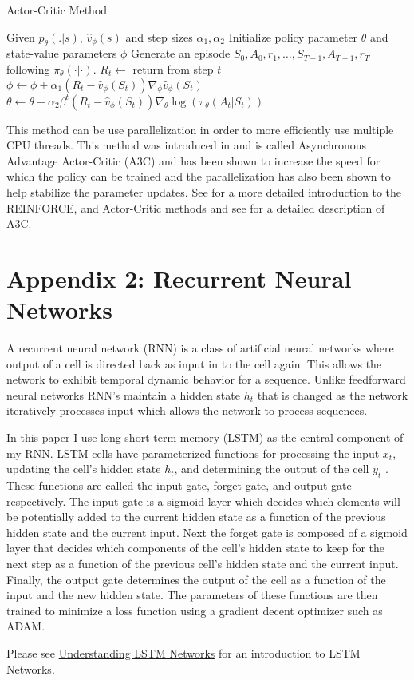 \documentclass[12pt]{article}
\begin{document}
\begin{algorithm}[H]
  \caption{Actor-Critic Method}
  \begin{algorithmic}[1]
    \Procedure{}{} Given $p_\theta(.|s)$, $\hat{v}_\phi(s)$ and step sizes $\alpha_1, \alpha_2$
    \State Initialize policy parameter $\theta$ and state-value parameters $\phi$
    \State Generate an episode $S_0, A_0, r_1,\dots,S_{T-1},A_{T-1},r_T$ following $\pi_\theta(\cdot|\cdot)$.
    \State $R_t \leftarrow $ return from step $t$
    \State $\phi \leftarrow \phi + \alpha_1 (R_t-\hat{v}_\phi(S_t) )\nabla_\phi\hat{v}_\phi(S_t)$
    \State $\theta \leftarrow \theta + \alpha_2 \beta^t (R_t-\hat{v}_\phi(S_t) )\nabla_\theta \log(\pi_\theta(A_t|S_t))$
    \EndFor
    \EndWhile
    \EndProcedure
  \end{algorithmic}
\end{algorithm}

This method can be use parallelization in order to more efficiently use multiple CPU threads. This method was introduced in
\citet{2016_Mnih} and is called Asynchronous Advantage Actor-Critic (A3C) and has been shown to increase the speed for which the policy can be trained and the parallelization has also been shown to help stabilize the parameter updates. See \citep{1998_Sutton} for a more detailed introduction to the REINFORCE, and Actor-Critic methods and see \citep{2016_Mnih} for a detailed description of A3C.

\section*{Appendix 2: Recurrent Neural Networks}

A recurrent neural network (RNN) is a class of artificial neural networks where output of a cell is directed back as input in to the cell again. This allows the network to exhibit temporal dynamic behavior for a sequence. Unlike feedforward neural networks RNN's maintain a hidden state $h_t$ that is changed as the network iteratively processes input which allows the network to process sequences.

In this paper I use long short-term memory (LSTM) as the central component of my RNN. LSTM cells have parameterized functions for processing the input $x_t$, updating the cell's hidden state $h_t$, and determining the output of the cell $y_t$ \citep{1997_LSTM}. These functions are called the input gate, forget gate, and output gate respectively. The input gate is a sigmoid layer which decides which elements will be potentially added to the current hidden state as a function of the previous hidden state and the current input. Next the forget gate is composed of a sigmoid layer that decides which components of the cell's hidden state to keep for the next step as a function of the previous cell's hidden state and the current input. Finally, the output gate determines the output of the cell as a function of the input and the new hidden state. The parameters of these functions are then trained to minimize a loss function using a gradient decent optimizer such as ADAM.

Please see \href{http://colah.github.io/posts/2015-08-Understanding-LSTMs/}{Understanding LSTM Networks} for an introduction to LSTM Networks.



\end{document}
